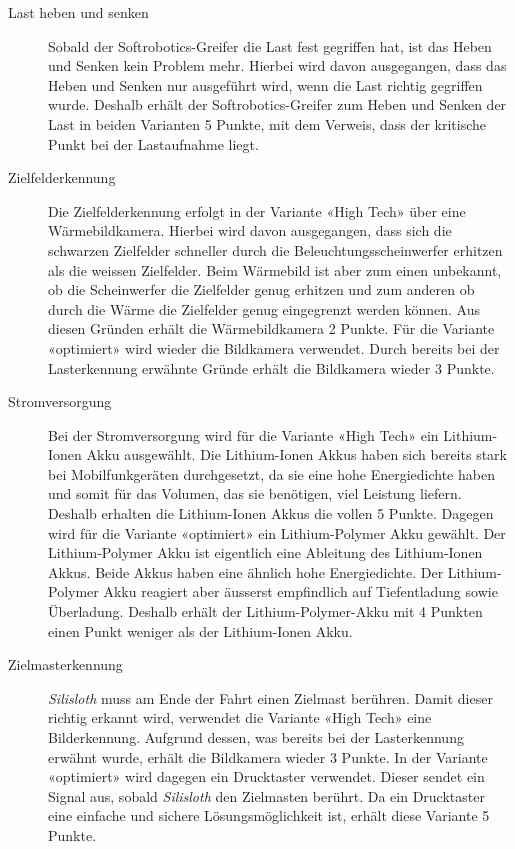 \documentclass[a4paper,11pt]{scrartcl}
\begin{document}
\begin{description}
    \item [Last heben und senken] Sobald der Softrobotics-Greifer die Last fest gegriffen hat, ist das Heben und Senken kein Problem mehr. Hierbei wird davon ausgegangen, dass das Heben und Senken nur ausgeführt wird, wenn die Last richtig gegriffen wurde. Deshalb erhält der Softrobotics-Greifer zum Heben und Senken der Last in beiden Varianten 5 Punkte, mit dem Verweis, dass der kritische Punkt bei der Lastaufnahme liegt.
    \item [Zielfelderkennung] Die Zielfelderkennung erfolgt in der Variante «High Tech» über eine Wärmebildkamera. Hierbei wird davon ausgegangen, dass sich die schwarzen Zielfelder schneller durch die Beleuchtungsscheinwerfer erhitzen als die weissen Zielfelder. Beim Wärmebild ist aber zum einen unbekannt, ob die Scheinwerfer die Zielfelder genug erhitzen und zum anderen ob durch die Wärme die Zielfelder genug eingegrenzt werden können. Aus diesen Gründen erhält die Wärmebildkamera 2 Punkte.  Für die Variante «optimiert» wird wieder die Bildkamera verwendet. Durch bereits bei der Lasterkennung erwähnte Gründe erhält die Bildkamera wieder 3 Punkte.
    \item [Stromversorgung] Bei der Stromversorgung wird für die Variante «High Tech» ein Lithium-Ionen Akku ausgewählt. Die Lithium-Ionen Akkus haben sich bereits stark bei Mobilfunkgeräten durchgesetzt, da sie eine hohe Energiedichte haben und somit für das Volumen, das sie benötigen, viel Leistung liefern. Deshalb erhalten die Lithium-Ionen Akkus die vollen 5 Punkte. Dagegen wird für die Variante «optimiert» ein Lithium-Polymer Akku gewählt. Der Lithium-Polymer Akku ist eigentlich eine Ableitung des Lithium-Ionen Akkus. Beide Akkus haben eine ähnlich hohe Energiedichte. Der Lithium-Polymer Akku reagiert aber äusserst empfindlich auf Tiefentladung sowie Überladung. Deshalb erhält der Lithium-Polymer-Akku mit 4 Punkten einen Punkt weniger als der Lithium-Ionen Akku.
    \item [Zielmasterkennung] \textit{Silisloth} muss am Ende der Fahrt einen Zielmast berühren. Damit dieser richtig erkannt wird, verwendet die Variante «High Tech» eine Bilderkennung. Aufgrund dessen, was bereits bei der Lasterkennung erwähnt wurde, erhält die Bildkamera wieder 3 Punkte. In der Variante «optimiert» wird dagegen ein Drucktaster verwendet. Dieser sendet ein Signal aus, sobald \textit{Silisloth} den Zielmasten berührt. Da ein Drucktaster eine einfache und sichere Lösungsmöglichkeit ist, erhält diese Variante 5 Punkte.

\end{description}
\end{document}
